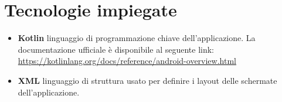 \section{Tecnologie impiegate}
\begin{itemize}
	\item \textbf{Kotlin} linguaggio di programmazione chiave dell'applicazione. La documentazione ufficiale è disponibile al seguente link:
	\newline \url{https://kotlinlang.org/docs/reference/android-overview.html}
	\item \textbf{XML} linguaggio di struttura usato per definire i layout delle schermate dell'applicazione.
\end{itemize}
